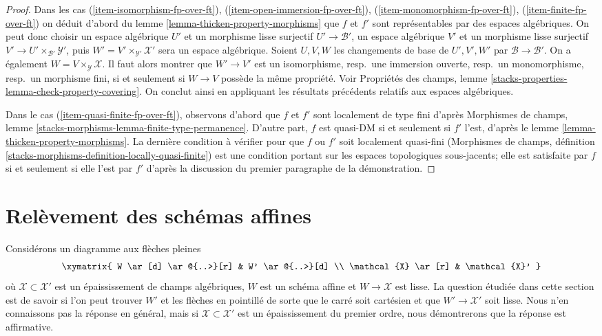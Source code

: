 \begin{proof}
\medskip\noindent
Dans les cas (\ref{item-isomorphism-fp-over-ft}),
(\ref{item-open-immersion-fp-over-ft}),
(\ref{item-monomorphism-fp-over-ft}),
(\ref{item-finite-fp-over-ft})
on déduit d'abord du lemme \ref{lemma-thicken-property-morphisms}
que $f$ et $f'$ sont représentables par des espaces algébriques. On peut donc choisir
un espace algébrique $U'$ et un morphisme lisse surjectif
$U' \to \mathcal{B}'$,
un espace algébrique $V'$ et un morphisme lisse surjectif
$V' \to U' \times_{\mathcal{B}'} \mathcal{Y}'$, puis
$W' = V' \times_{\mathcal{Y}'} \mathcal{X}'$ sera un espace algébrique.
Soient $U, V, W$ les changements de base de
$U', V', W'$ par $\mathcal{B} \to \mathcal{B}'$.
On a également $W = V \times_\mathcal{Y} \mathcal{X}$.
Il faut alors montrer que $W' \to V'$ est un
isomorphisme, resp.\ une immersion ouverte, resp.\ un monomorphisme,
resp.\ un morphisme fini, si et seulement si $W \to V$ possède la même propriété.
Voir Propriétés des champs, lemme
\ref{stacks-properties-lemma-check-property-covering}.
On conclut ainsi en appliquant les résultats
précédents relatifs aux espaces algébriques.

\medskip\noindent
Dans le cas (\ref{item-quasi-finite-fp-over-ft}), observons d'abord
que $f$ et $f'$ sont localement de type fini d'après
Morphismes de champs, lemme \ref{stacks-morphisms-lemma-finite-type-permanence}.
D'autre part, $f$ est quasi-DM si et seulement si
$f'$ l'est, d'après le
lemme \ref{lemma-thicken-property-morphisms}.
La dernière condition à vérifier pour que $f$ ou $f'$ soit localement quasi-fini
(Morphismes de champs, définition
\ref{stacks-morphisms-definition-locally-quasi-finite})
est une condition portant sur les espaces topologiques sous-jacents;
elle est satisfaite par $f$ si et seulement si elle l'est par $f'$ d'après
la discussion du premier paragraphe de la démonstration.
\end{proof}









\section{Relèvement des schémas affines}
\label{section-lifting-affines}

\noindent
Considérons un diagramme aux flèches pleines
$$
\xymatrix{
W \ar[d] \ar@{..>}[r] & W' \ar@{..>}[d] \\
\mathcal{X} \ar[r] & \mathcal{X}'
}
$$
où $\mathcal{X} \subset \mathcal{X}'$ est un épaississement de champs algébriques,
$W$ est un schéma affine et $W \to \mathcal{X}$ est lisse. La question
étudiée dans cette section est de savoir si l'on peut trouver $W'$ et les flèches
en pointillé de sorte que le carré soit cartésien et que $W' \to \mathcal{X}'$ soit lisse.
Nous n'en connaissons pas la réponse en général, mais si $\mathcal{X} \subset \mathcal{X}'$
est un épaississement du premier ordre, nous démontrerons que la réponse est affirmative.

